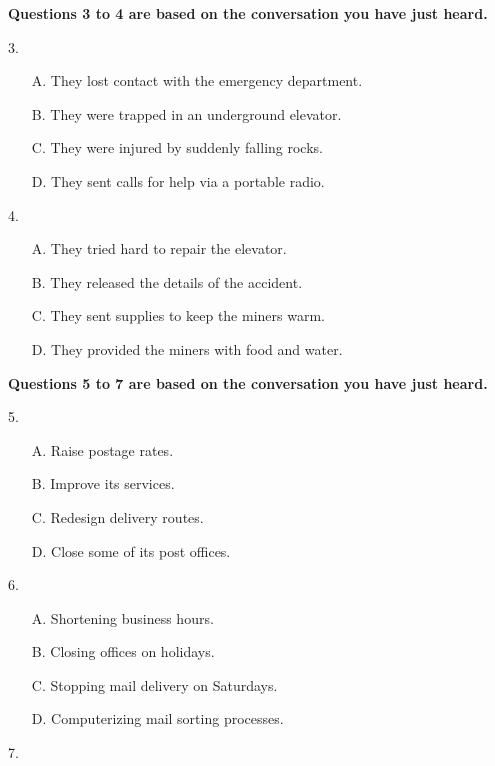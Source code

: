 \documentclass[UTF8,11pt]{ctexart}
\begin{document}
\textbf{Questions 3 to 4 are based on the conversation you have just heard.}


3.


\begin{itemize}[leftmargin=2em,itemsep=.2em,topsep=.4em]\item[A.] They lost contact with the emergency department.
\item[B.] They were trapped in an underground elevator.
\item[C.] They were injured by suddenly falling rocks.
\item[D.] They sent calls for help via a portable radio.
\end{itemize}

4.


\begin{itemize}[leftmargin=2em,itemsep=.2em,topsep=.4em]\item[A.] They tried hard to repair the elevator.
\item[B.] They released the details of the accident.
\item[C.] They sent supplies to keep the miners warm.
\item[D.] They provided the miners with food and water.
\end{itemize}

\textbf{Questions 5 to 7 are based on the conversation you have just heard.}


5.


\begin{itemize}[leftmargin=2em,itemsep=.2em,topsep=.4em]\item[A.] Raise postage rates.
\item[B.] Improve its services.
\item[C.] Redesign delivery routes.
\item[D.] Close some of its post offices.
\end{itemize}

6.


\begin{itemize}[leftmargin=2em,itemsep=.2em,topsep=.4em]\item[A.] Shortening business hours.
\item[B.] Closing offices on holidays.
\item[C.] Stopping mail delivery on Saturdays.
\item[D.] Computerizing mail sorting processes.
\end{itemize}

7.
\end{document}
